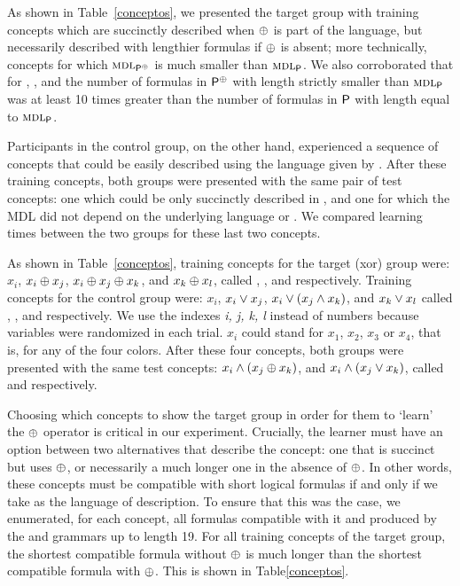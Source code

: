 As shown in Table~\ref{conceptos}, we presented the target group with training concepts which are succinctly described when $\oplus$ is part of the language, but necessarily described with lengthier formulas if $\oplus$ is absent; more technically, concepts for which $\textsc{mdl}_{{\sf P}^\oplus}$ is much smaller than $\textsc{mdl}_{{\sf P}}$. We also corroborated that for \targetb, \targetc, \targetd and \testa the number of formulas in ${\sf P}^\oplus$ with length strictly smaller than $\textsc{mdl}_{{\sf P}}$ was at least 10 times greater than the number of formulas in ${\sf P}$ with length equal to $\textsc{mdl}_{{\sf P}}$.

Participants in the control group, on the other hand, experienced a sequence of concepts that could be easily described using the language given by \grambool. After these training concepts, both groups were presented with the same pair of test concepts: one which could be only succinctly described in \gramboolxor, and one for which the MDL did not depend on the underlying language \gramboolxor or \grambool. We compared learning times between the two groups for these last two concepts.


As shown in Table~\ref{conceptos}, training concepts for the target (xor) group were: $x_{i}$, $x_{i} \oplus x_{j}$, $x_{i} \oplus x_{j} \oplus x_{k}$, and $x_{k} \oplus x_{l}$, called \targeta, \targetb, \targetc and \targetd respectively. Training concepts for the control group were: $x_{i}$, $x_{i} \vee x_{j}$, $x_{i} \vee (x_{j} \wedge x_{k})$, and $x_{k} \vee x_{l}$ called \controla, \controlb, \controlc and \controld respectively. We use the indexes \textit{i, j, k, l} instead of numbers because variables were randomized in each trial. $x_{i}$ could stand for $x_1$, $x_2$, $x_3$ or $x_4$, that is, for any of the four colors. After these four concepts, both groups were presented with the same test concepts: $x_{i} \wedge (x_{j} \oplus x_{k})$, and $x_{i} \wedge (x_{j} \vee x_{k})$, called \testa and \testb respectively.

Choosing which concepts to show the target group in order for them to `learn' the $\oplus$ operator is critical in our experiment. Crucially, the learner must have an option between two alternatives that describe the concept: one that is succinct but uses $\oplus$, or necessarily a much longer one in the absence of $\oplus$. In other words, these concepts must be compatible with short logical formulas if and only if we take \gramboolxor as the language of description. To ensure that this was the case, we enumerated, for each concept, all formulas compatible with it and produced by the \grambool and \gramboolxor grammars up to length 19. For all training concepts of the target group, the shortest compatible formula without $\oplus$ is much longer than the shortest compatible formula with $\oplus$. This is shown in Table\ref{conceptos}.

